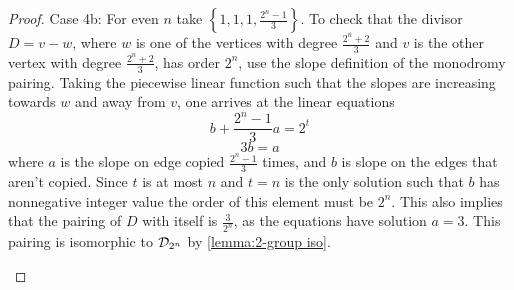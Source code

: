 \documentclass{amsart}
\begin{document}
\begin{proof}
    Case 4b: For even $n$ take $\left\{1, 1, 1,
\frac{2^{n}-1}{3}\right\}$. To check that the divisor $D=v-w$,
where $w$ is one of the vertices with degree $\frac{2^{n}+2}{3}$
and $v$ is the other vertex with degree $\frac{2^{n}+2}{3}$, has
order $2^{n}$, use the slope definition of the monodromy pairing. Taking the piecewise linear function such that the slopes are increasing towards $w$ and away from $v$, one arrives at the linear equations
\begin{equation*}
b+ \frac{2^{n}-1}{3}a=2^{t}
\end{equation*}
\begin{equation*}
3b=a
\end{equation*}
where $a$ is the slope on edge copied $\frac{2^{n}-1}{3}$ times, and $b$
is slope on the edges that aren't copied. Since $t$ is at most $n$ and $t=n$ is the only solution such that $b$ has nonnegative integer value the order of this element must be $2^{n}$. This also implies that the pairing of $D$ with itself is $\frac{3}{2^{n}}$, as the equations have solution $a=3$. This pairing is isomorphic to
$\mathcal{D}_{2^{n}}$ by  \ref{lemma:2-group iso}.

\begin{center}
\end{center}
\end{proof}

\begin{prop}
\label{prop: E_2}
\end{prop}

\begin{center}
\end{center}
\end{document}
